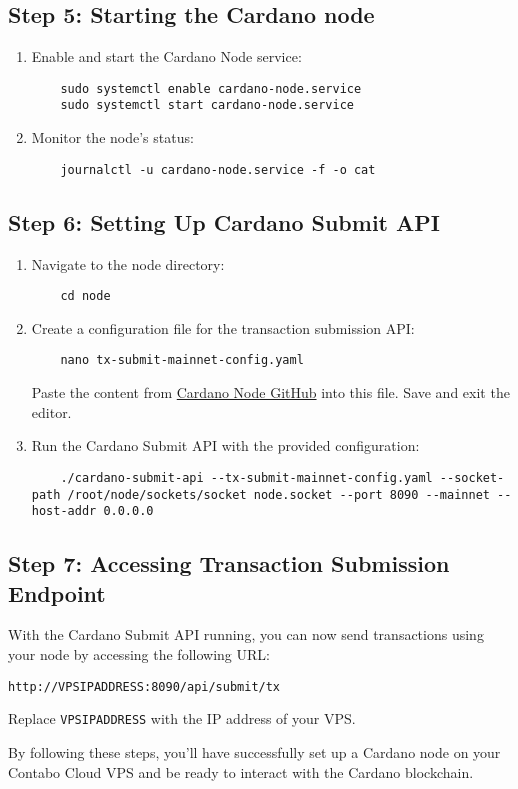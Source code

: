 \subsection{Step 5: Starting the Cardano node}
\begin{enumerate}
  \item Enable and start the Cardano Node service:
        \begin{verbatim}
    sudo systemctl enable cardano-node.service
    sudo systemctl start cardano-node.service
    \end{verbatim}
  \item Monitor the node's status:
        \begin{verbatim}
    journalctl -u cardano-node.service -f -o cat
    \end{verbatim}
\end{enumerate}

\subsection{Step 6: Setting Up Cardano Submit API}
\begin{enumerate}
  \item Navigate to the node directory:
        \begin{verbatim}
    cd node
    \end{verbatim}
  \item Create a configuration file for the transaction submission API:
        \begin{verbatim}
    nano tx-submit-mainnet-config.yaml
    \end{verbatim}
        Paste the content from \href{https://github.com/input-output-hk/cardano-node/blob/master/cardano-submit-api/config/tx-submit-mainnet-config.yaml}{Cardano Node GitHub} into this file. Save and exit the editor.
  \item Run the Cardano Submit API with the provided configuration:
        \begin{verbatim}
    ./cardano-submit-api --tx-submit-mainnet-config.yaml --socket-path /root/node/sockets/socket node.socket --port 8090 --mainnet --host-addr 0.0.0.0
    \end{verbatim}
\end{enumerate}

\subsection{Step 7: Accessing Transaction Submission Endpoint}
With the Cardano Submit API running, you can now send transactions using your node by accessing the following URL:
\begin{verbatim}
http://VPSIPADDRESS:8090/api/submit/tx
\end{verbatim}
Replace \texttt{VPSIPADDRESS} with the IP address of your VPS.

By following these steps, you'll have successfully set up a Cardano node on your Contabo Cloud VPS and be ready to interact with the Cardano blockchain.

